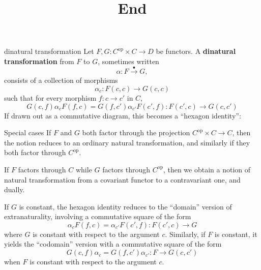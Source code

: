 \documentclass{beamer}
\title{End}
\date{}
\begin{document}
\begin{frame}
    \titlepage
\end{frame}

\begin{frame}{dinatural transformation}
Let $F, G \colon C^{\mathrm{op}} \times C \to D$ be functors. A \textbf{dinatural transformation} from $F$ to $G$, sometimes written
\[
\alpha \colon F \overset{\bullet}{\to} G,
\]
consists of a collection of morphisms
\[
\alpha_c \colon F(c,c) \to G(c,c)
\]
such that for every morphism $f \colon c \to c'$ in $C$,
\[
G(c,f)\alpha_c F(f,c) = G(f,c')\alpha_{c'} F(c',f) \colon F(c',c) \to G(c,c')
\]
If drawn out as a commutative diagram, this becomes a ``hexagon identity'':

\begin{center}
\end{center}
\end{frame}

\begin{frame}{Special cases}
If $F$ and $G$ both factor through the projection $C^{\mathrm{op}}\times C\to C$, then the notion reduces to an ordinary natural transformation, and similarly if they both factor through $C^{\mathrm{op}}$.

If $F$ factors through $C$ while $G$ factors through $C^{\mathrm{op}}$, then we obtain a notion of natural transformation from a covariant functor to a contravariant one, and dually.

If $G$ is constant, the hexagon identity reduces to the ``domain'' version of extranaturality, involving a commutative square of the form
\[
\alpha_c F(f,c)=\alpha_{c'}F(c',f)\colon F(c',c)\to G
\]
where $G$ is constant with respect to the argument $c$. Similarly, if $F$ is constant, it yields the ``codomain'' version with a commutative square of the form
\[
G(c,f)\alpha_c=G(f,c')\alpha_{c'}\colon F\to G(c,c')
\]
when $F$ is constant with respect to the argument $c$.
\end{frame}
\end{document}
